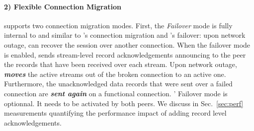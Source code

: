 
\paragraph*{2) Flexible Connection Migration} \tcpls supports two connection migration modes. First, the \textit{Failover} mode is fully internal to \tcpls and similar to \quic's connection migration and \mptcp's failover:
upon network outage, \tcpls can recover the session over another \tcp
connection. When the failover mode is enabled, \tcpls sends stream-level record
acknowledgements announcing to the peer the records that have been received
over each stream. Upon network outage, \tcpls \textbf{\textit{moves}} the
active streams out of the broken \tcp connection to an active one. Furthermore,
the unacknowledged data records that were sent over a failed \tcp connection are
\textbf{\textit{sent again}} on a functional \tcp connection.
\tcpls' Failover mode is optionnal. It needs to be activated by both peers.
We discuss in Sec.~\ref{sec:perf} measurements quantifying the
performance impact of adding \tcpls record level acknowledgements.

